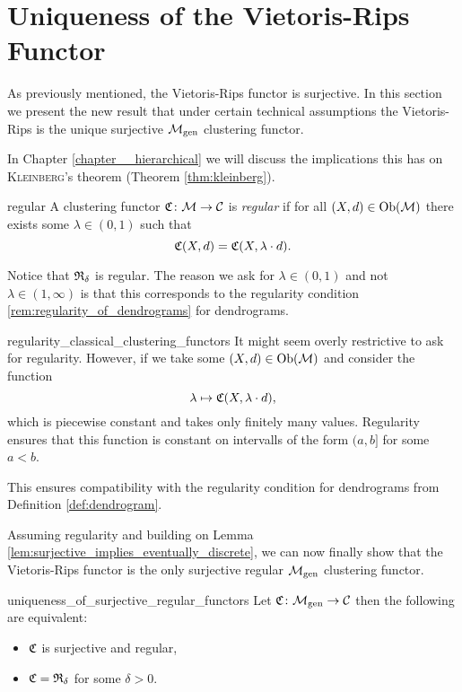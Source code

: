 \section{Uniqueness of the Vietoris-Rips Functor}

As previously mentioned, the Vietoris-Rips functor is surjective.
In this section we present the new result that under certain technical assumptions the Vietoris-Rips is the unique surjective ${\mathcal{M}_\mathrm{gen}}$ clustering functor.

In Chapter \ref{chapter__hierarchical} we will discuss the implications this has on \textsc{Kleinberg}'s theorem (Theorem \ref{thm:kleinberg}).

\begin{definition}{}{regular}
    A clustering functor $\mathfrak{C}\colon \mathcal{M} \to \mathcal{C}$ is \emph{regular} if for all $(X,d) \in \mathrm {Ob}(\mathcal{M})$ there exists some $\lambda \in (0, 1)$ such that
    $$
    \mathfrak{C}(X,d) = \mathfrak{C}(X, \lambda \cdot d).
    $$
\end{definition}

Notice that $\mathfrak{R}_\delta$ is regular. 
The reason we ask for $\lambda \in (0,1)$ and not $\lambda \in (1, \infty)$ is that this corresponds to the regularity condition \ref{rem:regularity_of_dendrograms} for dendrograms.\par

\begin{myremark}{}{regularity_classical_clustering_functors}
It might seem overly restrictive to ask for regularity.
However, if we take some $(X, d) \in \mathrm {Ob}(\mathcal{M})$ and consider the function 
$$
\lambda \mapsto \mathfrak{C}(X, \lambda \cdot d),
$$
which is piecewise constant and takes only finitely many values.
Regularity ensures that this function is constant on intervalls of the form $(a, b]$ for some $a < b$.

This ensures compatibility with the regularity condition for dendrograms from Definition \ref{def:dendrogram}.
\end{myremark}

Assuming regularity and building on Lemma \ref{lem:surjective_implies_eventually_discrete}, we can now finally show that the Vietoris-Rips functor is the only surjective regular ${\mathcal{M}_\mathrm{gen}}$ clustering functor.

\begin{theorem}{}{uniqueness_of_surjective_regular_functors}
    Let $\mathfrak{C}\colon {\mathcal{M}_\mathrm{gen}} \to \mathcal{C}$ then the following are equivalent:

    \begin{itemize}
        \item $\mathfrak{C}$ is surjective and regular,
        \item $\mathfrak{C} = \mathfrak{R}_{\delta}$ for some $\delta > 0$.
    \end{itemize}
\end{theorem}

